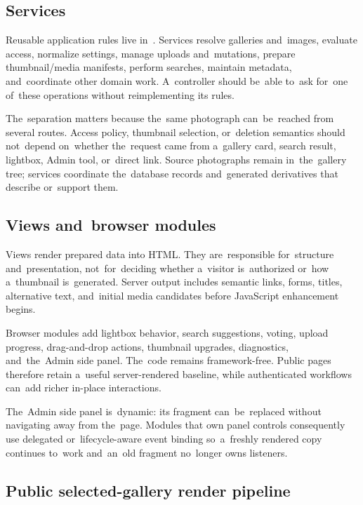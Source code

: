 \documentclass[11pt,a4paper]{article}
\newcommand{\filepath}[1]{\path{#1}}
\begin{document}
\subsection{Services}

Reusable application rules live in~\filepath{app/services/}. Services resolve
galleries and~images, evaluate access, normalize settings, manage uploads
and~mutations, prepare thumbnail/media manifests, perform searches, maintain
metadata, and~coordinate other domain work. A~controller should be~able to~ask
for~one of~these operations without reimplementing its rules.

The~separation matters because the~same photograph can~be~reached from several
routes. Access policy, thumbnail selection, or~deletion semantics should
not~depend on~whether the~request came from a~gallery card, search result,
lightbox, Admin tool, or~direct link. Source photographs remain in~the~gallery
tree; services coordinate the~database records and~generated derivatives that
describe or~support them.

\subsection{Views and~browser modules}

Views render prepared data into HTML. They are~responsible for~structure
and~presentation, not~for~deciding whether a~visitor is~authorized or~how
a~thumbnail is~generated. Server output includes semantic links, forms, titles,
alternative text, and~initial media candidates before JavaScript enhancement
begins.

Browser modules add lightbox behavior, search suggestions, voting, upload
progress, drag-and-drop actions, thumbnail upgrades, diagnostics, and~the~Admin
side panel. The~code remains framework-free. Public pages therefore retain
a~useful server-rendered baseline, while authenticated workflows can~add richer
in-place interactions.

The~Admin side panel is~dynamic: its fragment can~be~replaced without navigating
away from the~page. Modules that own panel controls consequently use delegated
or~lifecycle-aware event binding so~a~freshly rendered copy continues to~work
and~an~old fragment no~longer owns listeners.

\subsection{Public selected-gallery render pipeline}
\end{document}
